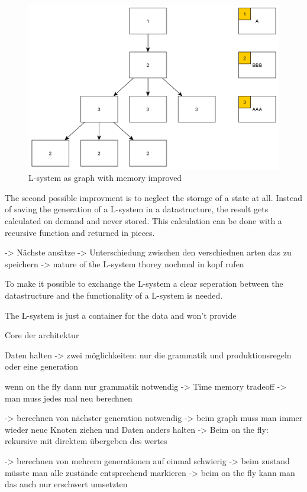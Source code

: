 \documentclass[english]{cpp-hmwk}
\begin{document}
\begin{figure}[h!]
	\centering
	\includegraphics[width=0.8\columnwidth]{../graphs/LSystem/examples/lsystem_graph_reduced_example.png}
	\caption{L-system as graph with memory improved}
	\label{figure:lsystem_graph_mem_reduction}
\end{figure}

The second possible improvment is to neglect the storage of a state at all. Instead of saving the generation of a L-system in a datastructure, the result gets calculated on demand and never stored. This calculation can be done with a recursive function and returned in pieces. 



\bigskip
-> Nächste ansätze -> Unterschiedung zwischen den verschiednen arten das zu speichern -> nature of the L-system thorey nochmal in kopf rufen

To make it possible to exchange the L-system a clear seperation between the datastructure and the functionality of a L-system is needed.

 The L-system is just a container for the data and won't provide 

Core der architektur

Daten halten -> zwei möglichkeiten: nur die grammatik und produktionsregeln oder eine generation  

wenn on the fly dann nur grammatik notwendig -> Time memory tradeoff -> man muss jedes mal neu berechnen  

-> berechnen von nächster generation notwendig 	-> beim graph muss man immer wieder neue Knoten ziehen und Daten anders halten
								-> Beim on the fly: rekursive mit direktem übergeben des wertes

-> berechnen von mehrern generationen auf einmal schwierig 
	-> beim zustand müsste man alle zustände entsprechend markieren
	-> beim on the fly kann man das auch nur erschwert umsetzten
\end{document}
